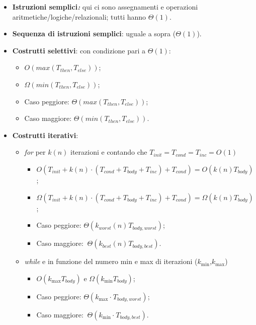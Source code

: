 \begin{itemize}
\item
  \textbf{Istruzioni semplici\emph{: }}qui ci sono assegnamenti e
  operazioni aritmetiche/logiche/relazionali; tutti hanno \(\Theta(1)\).
\item
  \textbf{Sequenza di istruzioni semplici}: uguale a sopra
  (\(\Theta(1)\)).
\item
  \textbf{Costrutti selettivi}: con condizione pari a \(\Theta(1)\):

  \begin{itemize}
  \item
    \(O(max(T_{then},T_{else}))\);
  \item
    \(\Omega(min(T_{then},T_{else}))\);
  \item
    Caso peggiore: \(\Theta(max(T_{then},T_{else}))\);
  \item
    Caso maggiore: \(\Theta(min(T_{then},T_{else}))\).
  \end{itemize}
\item
  \textbf{Costrutti iterativi}:

  \begin{itemize}
  \item
    \emph{for} per \(k(n)\) iterazioni e contando che
    \(T_{init} = T_{cond} = T_{inc} = O(1)\)

    \begin{itemize}
    \item
      \(O(T_{init} + k(n) \cdot (T_{cond} + T_{body} + T_{inc}) + T_{cond}) = O(k(n)T_{body})\);
    \item
      \(\Omega(T_{init} + k(n) \cdot (T_{cond} + T_{body} + T_{inc}) + T_{cond}) = \Omega(k(n)T_{body})\);
    \item
      Caso peggiore: \(\Theta({k_{worst}(n)}_{}T_{body,worst})\);
    \item
      Caso maggiore: \(\ \Theta({k_{best}(n)}_{}T_{body,best})\).
    \end{itemize}
  \item
    \emph{while} e in funzione del numero min e max di iterazioni
    (\(k_{\min}\),\(k_{\max}\))

    \begin{itemize}
    \item
      \(O(k_{\max}T_{body})\) e \(\Omega(k_{\min}T_{body})\);
    \item
      Caso peggiore: \(\Theta({k_{\max} \cdot}_{}T_{body,worst})\);
    \item
      Caso maggiore: \(\ \Theta({k_{\min} \cdot}_{}T_{body,best})\).
    \end{itemize}
  \end{itemize}
\end{itemize}

